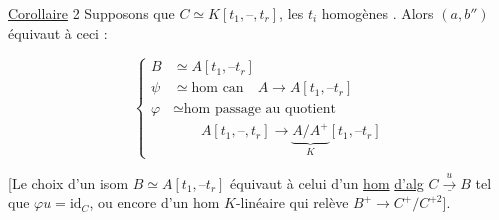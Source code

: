 \uline{Corollaire} 2 Supposons que $C\simeq K[t_1,\text{--},t_r]$, les $t_i$ homogènes . Alors $(a,b'')$ équivaut à ceci :

\[
\left\{\begin{aligned}
 B&\simeq A[t_1,\text{--}t_r]\\
 \psi&\simeq\text{hom can}\quad A\longrightarrow A[t_1,\text{--}t_r]\\
 \varphi&\simeq\text{hom passage au quotient}\\
 &\qquad A[t_1,\text{--},t_r]\longrightarrow\underbrace{A/A^+}_{K}[t_1,\text{--}t_r]
\end{aligned}\right.
\]

[Le choix d'un isom $B\simeq A[t_1,\text{--}t_r]$ équivaut à celui d'un \uline{hom} \uline{d'alg}  $\underline{C\xrightarrow{u}B}$ tel que $\varphi u=\mathrm{id}_C$, ou encore d'un hom $K$-linéaire qui relève $B^+\longrightarrow C^+/C^{+2}$].

